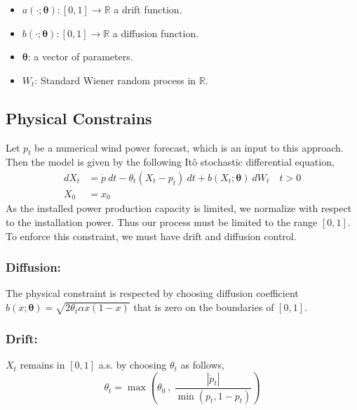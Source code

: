 \documentclass[ima, 20pt, portrait, plainboxedsections]{sciposter}
\newcommand{\R}{\mathbb{R}}
\begin{document}
\begin{multicols}{3}
\begin{itemize}
\item $a(\cdot; \bm{\theta}):[0,1] \to \R $  a drift function.
\item $b (\cdot; \bm{\theta} ):[0,1] \to \R$  a  diffusion function.
\item $\bm{\theta}$: a vector of parameters.
\item $W_t$: Standard Wiener random process in $\R$.
\end{itemize}

\subsection*{Physical Constrains}
Let $p_t$ be a numerical wind power forecast, which is an input to this approach. Then the model is given by the following It\^{o} stochastic differential equation,
\begin{equation}
\begin{split}
dX_t&= \dot{p} \ dt - \theta_t( X_t- p_t) \ dt + b (X_t; \bm{\theta} ) \ dW_t \quad t > 0 \\
X_0&=x_0
\end{split}
\end{equation}
As the  installed power production capacity is limited, we normalize with respect to the installation power. Thus our process must be limited to the range $[0,1]$. To enforce this constraint, we must have drift and diffusion control.
\subsubsection*{Diffusion: } The physical constraint is respected  by choosing  diffusion coefficient $ b (x; \bm{\theta} )= \sqrt{2 \theta_t \alpha x (1-x)} $ that is zero on the boundaries of $[0,1]$.
\subsubsection*{Drift: }
$X_t$ remains in $[0,1]$ a.s. by choosing $\theta_t$ as follows,
\begin{equation}
\theta_t = \max \left( \theta_0 \ , \ \frac{|\dot{p}_t|}{\min (p_t, 1-p_t)}  \right )
\end{equation}


\end{multicols}
\end{document}
